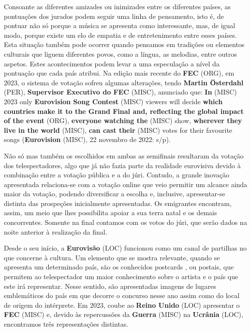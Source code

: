 \documentclass[12pt,a4paper]{article}
\begin{document}
Consoante as diferentes amizades ou inimizades entre os diferentes países, as pontuações dos jurados podem seguir uma linha de pensamento, isto é, de pontuar não só porque a música  se  apresenta  como  interessante,  mas,  de  igual  modo,  porque  existe  um  elo  de empatia  e  de  entretenimento  entre  esses  países.  Esta  situação  também  pode  ocorrer quando pensamos em tradições ou elementos culturais que liguem diferentes povos, como a  língua,  as  melodias,  entre  outros  aspetos.  Estes  acontecimentos  podem  levar  a  uma especulação a nível da pontuação que cada país atribui. Na edição mais recente do \textbf{FEC} (ORG), em  2023,  o  sistema  de  votação  sofreu  algumas  alterações,  tendo  \textbf{Martin  Österdahl} (PER), \textbf{Supervisor Executivo do FEC} (MISC), anunciado que: \textbf{In} (MISC) 2023 only \textbf{Eurovision Song Contest} (MISC) viewers will decide \textbf{which countries make it to the Grand Final and, reflecting the global impact of the event} (ORG), \textbf{everyone watching the} (MISC) show, \textbf{wherever they live in the world} (MISC), \textbf{can cast their} (MISC) votes for their favourite songs (\textbf{Eurovision} (MISC), 22 novembro de 2022: s/p).

Não só mas também os escolhidos em ambas as semifinais resultaram da votação dos  telespectadores,  algo  que  já  não  fazia  parte  da  realidade  eurovisiva  devido  à combinação entre a votação pública e a do júri. Contudo, a grande inovação apresentada relaciona-se com a votação online que veio permitir um alcance ainda maior da votação, podendo  diversificar  a  escolha  e,  inclusive,  apresentar-se  distinta  das  prospeções inicialmente apresentadas. Os emigrantes encontram, assim, um meio que lhes possibilita apoiar a sua terra natal e os demais concorrentes. Somente na final contamos com os votos do júri, que serão dados na noite anterior à realização da final.

Desde  o  seu  início,  a  \textbf{Eurovisão} (LOC)  funcionou  como  um  canal  de  partilhas  no  que concerne  à  cultura.  Um  elemento  que  se  mostra  relevante,  quando  se  apresenta  um determinado país, são os conhecidos postcards , ou postais, que permitem ao telespectador um maior conhecimento sobre o artista e o país que este irá representar. Nesse sentido, são apresentadas imagens de lugares emblemáticos do país em que decorre o concurso nesse ano assim como do local de origem do intérprete. Em 2023, coube ao \textbf{Reino Unido} (LOC) apresentar  o  \textbf{FEC} (MISC)  e,  devido  às  repercussões  da  \textbf{Guerra} (MISC)  na  \textbf{Ucrânia} (LOC),  encontramos  três representações distintas.
\end{document}
